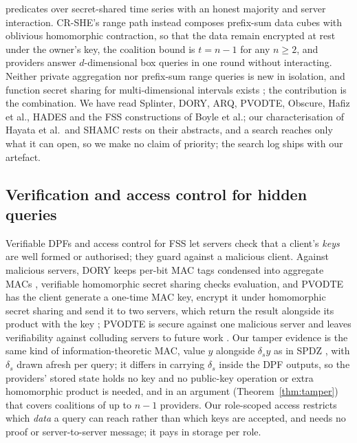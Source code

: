 \documentclass[a4paper,fleqn]{cas-sc}
\begin{document}
predicates over secret-shared time series with an honest majority and server
interaction. CR-SHE's range path instead
composes prefix-sum data cubes with oblivious homomorphic contraction, so that
the data remain encrypted at rest under the owner's key, the coalition bound is
$t=n-1$ for any $n\ge 2$, and providers answer $d$-dimensional box queries in
one round without interacting. Neither private aggregation nor prefix-sum range
queries is new in isolation, and function secret sharing for multi-dimensional
intervals exists \citep{boyle2016function}; the contribution is the
combination. We have read Splinter, DORY, ARQ, PVODTE, Obscure, Hafiz et
al., HADES and the FSS constructions of Boyle et al.; our characterisation of
Hayata et al.\ and SHAMC rests on their abstracts, and a search reaches only
what it can open, so we make no claim of priority; the search log ships with
our artefact.

\subsection{Verification and access control for hidden queries}
Verifiable DPFs \citep{decastro2022lightweight} and access control for FSS
\citep{pacl,ji2023finegrained} let servers check that a client's \emph{keys}
are well formed or authorised; they guard against a malicious client. Against
malicious servers, DORY keeps per-bit MAC tags condensed into aggregate MACs
\citep[\S4.3]{dory}, verifiable homomorphic secret sharing
\citep{choudhuri2024vehss} checks evaluation, and PVODTE \citep{li2026silent}
has the client generate a one-time MAC key, encrypt it under homomorphic secret
sharing and send it to two servers, which return the result alongside its
product with the key \citep[\S VII-B]{li2026silent}; PVODTE is secure against
one malicious server and leaves verifiability against colluding servers to
future work \citep[\S IV-D]{li2026silent}. Our tamper evidence is the same kind
of information-theoretic MAC, value $y$ alongside $\delta_s y$ as in SPDZ
\citep{damgard2012spdz}, with $\delta_s$ drawn afresh per query; it differs in
carrying $\delta_s$ inside the DPF outputs, so the providers' stored state holds
no key and no public-key operation or extra homomorphic product is needed, and
in an argument (Theorem~\ref{thm:tamper}) that covers coalitions of up to
$n-1$ providers. Our role-scoped access restricts which \emph{data} a
query can reach rather than which keys are accepted, and needs no proof or
server-to-server message; it pays in storage per role.
\end{document}
